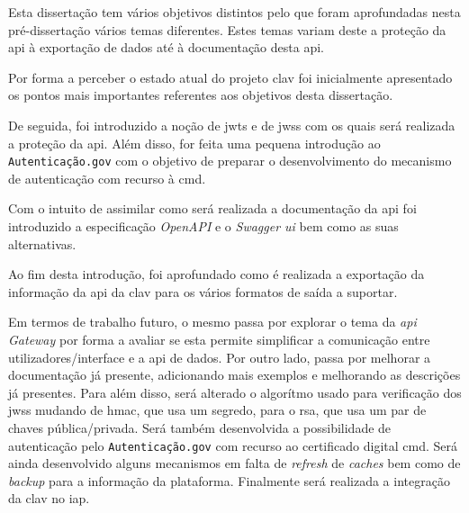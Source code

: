 
Esta dissertação tem vários objetivos distintos pelo que foram aprofundadas nesta pré-dissertação vários temas diferentes. Estes temas variam deste a proteção da \acrshort{api} à exportação de dados até à documentação desta \acrshort{api}.

Por forma a perceber o estado atual do projeto \acrshort{clav} foi inicialmente apresentado os pontos mais importantes referentes aos objetivos desta dissertação.

De seguida, foi introduzido a noção de \acrshort{jwt}s e de \acrshort{jws}s com os quais será realizada a proteção da \acrshort{api}. Além disso, for feita uma pequena introdução ao \texttt{Autenticação.gov} com o objetivo de preparar o desenvolvimento do mecanismo de autenticação com recurso à \acrlong{cmd}. 

Com o intuito de assimilar como será realizada a documentação da \acrshort{api} foi introduzido a especificação \textit{OpenAPI} e o \textit{Swagger \acrshort{ui}} bem como as suas alternativas.

Ao fim desta introdução, foi aprofundado como é realizada a exportação da informação da \acrshort{api} da \acrshort{clav} para os vários formatos de saída a suportar.

Em termos de trabalho futuro, o mesmo passa por explorar o tema da \textit{\acrshort{api} Gateway} por forma a avaliar se esta permite simplificar a comunicação entre utilizadores/interface e a \acrshort{api} de dados. Por outro lado, passa por melhorar a documentação já presente, adicionando mais exemplos e melhorando as descrições já presentes. Para além disso, será alterado o algorítmo usado para verificação dos \acrshort{jws}s mudando de \acrshort{hmac}, que usa um segredo, para o \acrshort{rsa}, que usa um par de chaves pública/privada. Será também desenvolvida a possibilidade de autenticação pelo \texttt{Autenticação.gov} com recurso ao certificado digital \acrlong{cmd}. Será ainda desenvolvido alguns mecanismos em falta de \textit{refresh} de \textit{caches} bem como de \textit{backup} para a informação da plataforma. Finalmente será realizada a integração da \acrshort{clav} no \acrshort{iap}.
